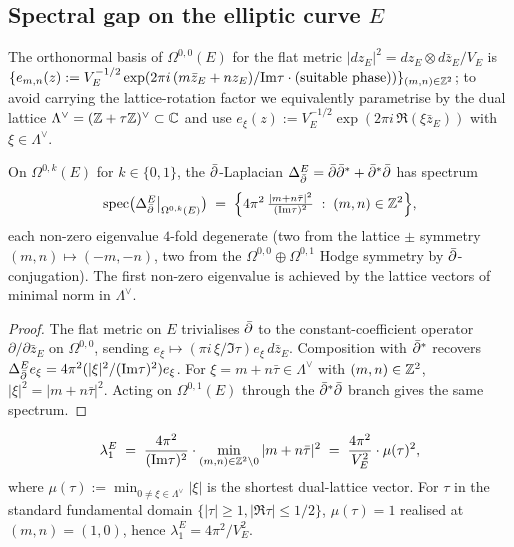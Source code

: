 \subsection{Spectral gap on the elliptic curve $E$}
\label{subsec:gap-elliptic-curve}

The orthonormal basis of $\Omega^{0,0}(E)$ for the flat metric
$|dz_E|^2 = dz_E \otimes d\bar z_E / V_E$ is
$\{e_{m,n}(z) := V_E^{-1/2} \exp(2\pi i\,(m \bar z_E + n z_E)/\mathrm{Im}\tau \cdot \text{(suitable phase)})\}_{(m,n) \in \mathbb{Z}^2}$;
to avoid carrying the lattice-rotation factor we equivalently parametrise
by the dual lattice $\Lambda^\vee = (\mathbb{Z} + \tau\mathbb{Z})^\vee \subset \mathbb{C}$
and use $e_\xi(z) := V_E^{-1/2} \exp(2\pi i\,\Re(\xi \bar z_E))$ with
$\xi \in \Lambda^\vee$.

\begin{lemma}
\label{lem:spectrum-elliptic}
\ClaimStatusLemma{}
On $\Omega^{0,k}(E)$ for $k \in \{0,1\}$, the $\bar\partial$-Laplacian
$\Delta_{\bar\partial}^E = \bar\partial\bar\partial^* + \bar\partial^*\bar\partial$ has spectrum
\begin{equation}
\label{eq:E-spectrum-formula}
 \mathrm{spec}\bigl(\Delta_{\bar\partial}^E \big|_{\Omega^{0,k}(E)}\bigr)
 \;=\; \Bigl\{ 4\pi^2\, \tfrac{|m + n\bar\tau|^2}{(\mathrm{Im}\tau)^2} \;:\; (m,n) \in \mathbb{Z}^2 \Bigr\},
\end{equation}
each non-zero eigenvalue $4$-fold degenerate
\textup{(}two from the lattice $\pm$ symmetry $(m,n) \mapsto (-m,-n)$,
two from the $\Omega^{0,0} \oplus \Omega^{0,1}$ Hodge symmetry by
$\bar\partial$-conjugation\textup{).} The first non-zero eigenvalue is achieved
by the lattice vectors of minimal norm in $\Lambda^\vee$.
\end{lemma}

\begin{proof}
The flat metric on $E$ trivialises $\bar\partial$ to the constant-coefficient
operator $\partial / \partial \bar z_E$ on $\Omega^{0,0}$, sending
$e_\xi \mapsto (\pi i\,\xi/\Im\tau) e_\xi \, d\bar z_E$. Composition with
$\bar\partial^*$ recovers $\Delta_{\bar\partial}^E e_\xi = 4\pi^2 (|\xi|^2/(\mathrm{Im}\tau)^2) e_\xi$.
For $\xi = m + n\bar\tau \in \Lambda^\vee$ with $(m,n) \in \mathbb{Z}^2$,
$|\xi|^2 = |m + n\bar\tau|^2$. Acting on $\Omega^{0,1}(E)$ through the
$\bar\partial^*\bar\partial$ branch gives the same spectrum.
\end{proof}

\begin{proposition}
\label{prop:lambda1-E}
\ClaimStatusProposition{}
\begin{equation}
\label{eq:lambda1-E}
 \lambda_1^E \;=\; \frac{4\pi^2}{(\mathrm{Im}\tau)^2} \cdot \min_{(m,n) \in \mathbb{Z}^2 \setminus 0} |m + n\bar\tau|^2
 \;=\; \frac{4\pi^2}{V_E^2} \cdot \mu(\tau)^2,
\end{equation}
where $\mu(\tau) := \min_{0 \neq \xi \in \Lambda^\vee} |\xi|$ is the
shortest dual-lattice vector. For $\tau$ in the standard fundamental
domain $\{|\tau| \geq 1, |\Re\tau| \leq 1/2\}$, $\mu(\tau) = 1$ realised
at $(m,n) = (1,0)$, hence $\lambda_1^E = 4\pi^2 / V_E^2$.
\end{proposition}


